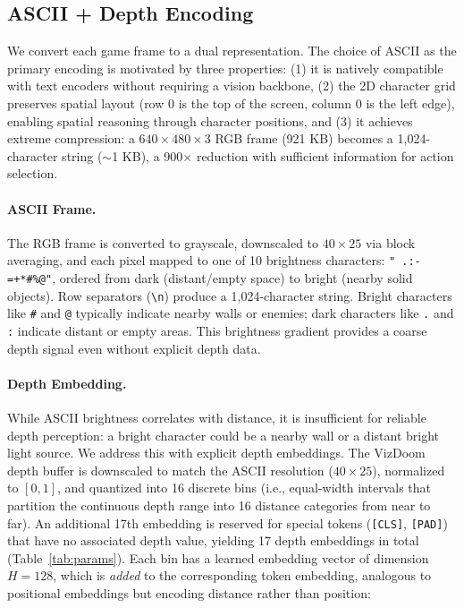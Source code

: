 \documentclass[11pt,a4paper]{article}
\begin{document}
\subsection{ASCII + Depth Encoding}

We convert each game frame to a dual representation. The choice of ASCII as the primary encoding is motivated by three properties: (1) it is natively compatible with text encoders without requiring a vision backbone, (2) the 2D character grid preserves spatial layout (row 0 is the top of the screen, column 0 is the left edge), enabling spatial reasoning through character positions, and (3) it achieves extreme compression: a $640 \times 480 \times 3$ RGB frame (921 KB) becomes a 1,024-character string (${\sim}$1 KB), a 900$\times$ reduction with sufficient information for action selection.

\paragraph{ASCII Frame.} The RGB frame is converted to grayscale, downscaled to $40 \times 25$ via block averaging, and each pixel mapped to one of 10 brightness characters: \texttt{" .:-=+*\#\%@"}, ordered from dark (distant/empty space) to bright (nearby solid objects). Row separators (\texttt{\textbackslash n}) produce a 1,024-character string. Bright characters like \texttt{\#} and \texttt{@} typically indicate nearby walls or enemies; dark characters like \texttt{.} and \texttt{:} indicate distant or empty areas. This brightness gradient provides a coarse depth signal even without explicit depth data.

\paragraph{Depth Embedding.} While ASCII brightness correlates with distance, it is insufficient for reliable depth perception: a bright character could be a nearby wall or a distant bright light source. We address this with explicit depth embeddings. The VizDoom depth buffer is downscaled to match the ASCII resolution ($40 \times 25$), normalized to $[0, 1]$, and quantized into 16 discrete bins (i.e., equal-width intervals that partition the continuous depth range into 16 distance categories from near to far). An additional 17th embedding is reserved for special tokens (\texttt{[CLS]}, \texttt{[PAD]}) that have no associated depth value, yielding 17 depth embeddings in total (Table~\ref{tab:params}). Each bin has a learned embedding vector of dimension $H=128$, which is \textit{added} to the corresponding token embedding, analogous to positional embeddings but encoding distance rather than position:
\end{document}
